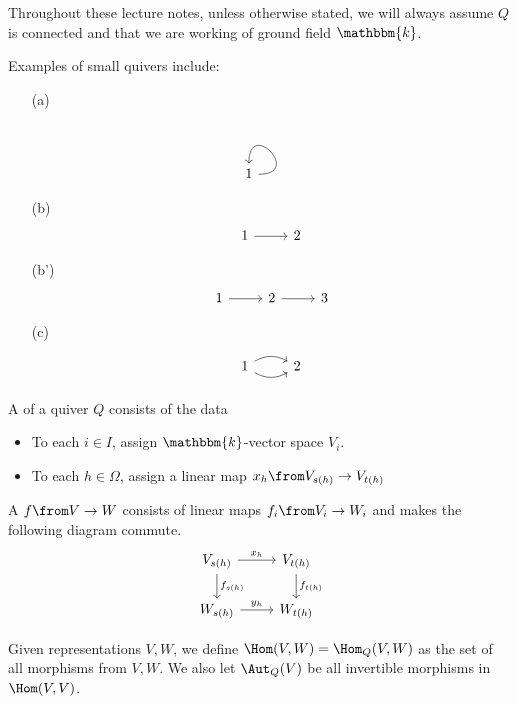 \documentclass[11pt,leqno,oneside]{amsbook}
\numberwithin{thm}{section}
\newcommand{\bbk}{\mathbbm{k}} %
\renewcommand{\Q}{Q} %
\begin{document}
Throughout these lecture notes, unless otherwise stated, we will
always assume \(\Q\) is connected and that we are working of ground
field \(\bbk\).
\begin{example} \label{ex1} Examples of small quivers include:
  \begin{enumerate}
  \item[(a)]  \[
      \begin{tikzcd}
        1 \arrow[out=0,in=90,loop]
      \end{tikzcd}
    \]
  \item[(b)] \[
      \begin{tikzcd}
        1 \arrow[r,""] & 2
      \end{tikzcd}
    \]
  \item[(b')] \[
      \begin{tikzcd}
        1 \arrow[r,""] & 2 \arrow[r] & 3
      \end{tikzcd}
    \]
  \item[(c)] \[
      \begin{tikzcd}
        1 \arrow[r,bend left,""] \arrow[r,bend right,swap,""] & 2
      \end{tikzcd}
    \]
  \end{enumerate}
\end{example}
\begin{defn}
  A  of a quiver \(\Q\) consists of the data
  \begin{itemize}
  \item To each \(i \in I\), assign \(\bbk\)-vector space \(V_i\).
  \item To each \(h \in \Omega\), assign a linear map \(x_h \from
    V_{s(h)} \to V_{t(h)}\)
  \end{itemize}
\end{defn}
\begin{defn}
  A  \(f \from V \to W\) consists of
  linear maps \(f_i \from V_i \to W_i\) and makes the following
  diagram commute.
\[  \begin{tikzcd}
    V_{s(h)} \arrow[d, "f_{s(h)}"] \arrow[r,"x_h"] & V_{t(h)} \arrow[d, "f_{t(h)}"] \\
    W_{s(h)} \arrow[r,"y_h"] & W_{t(h)}
  \end{tikzcd}
\]
\end{defn}
\begin{defn}
  Given representations \(V,W\), we define \(\Hom(V,W) = \Hom_\Q(V,W)\) as the set of all morphisms
  from \(V,W\). We also let \(\Aut_Q(V)\) be all invertible morphisms
  in \(\Hom(V,V)\).
\end{defn}
\end{document}
